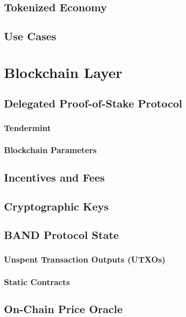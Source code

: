 \documentclass[letterpaper,11pt]{article}
\begin{document}
\subsection{Tokenized Economy}

\subsection{Use Cases}

\section{Blockchain Layer}

\subsection{Delegated Proof-of-Stake Protocol}

\subsubsection{Tendermint}

\subsubsection{Blockchain Parameters}

\subsection{Incentives and Fees}

\subsection{Cryptographic Keys}

\subsection{BAND Protocol State}

\subsubsection{Unspent Transaction Outputs (UTXOs)}

\subsubsection{Static Contracts}

\subsection{On-Chain Price Oracle}
\end{document}
